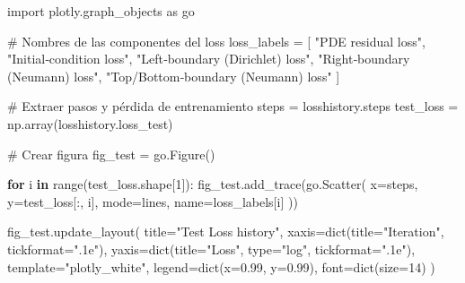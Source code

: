 \documentclass[
  spanish,
  us-letterpaper,
  DIV=11,
  numbers=noendperiod]{scrreprt}
\newenvironment{Shaded}{\begin{snugshade}}{\end{snugshade}}
\newcommand{\BuiltInTok}[1]{\textcolor[rgb]{0.00,0.23,0.31}{#1}}
\newcommand{\CommentTok}[1]{\textcolor[rgb]{0.37,0.37,0.37}{#1}}
\newcommand{\ControlFlowTok}[1]{\textcolor[rgb]{0.00,0.23,0.31}{\textbf{#1}}}
\newcommand{\DecValTok}[1]{\textcolor[rgb]{0.68,0.00,0.00}{#1}}
\newcommand{\FloatTok}[1]{\textcolor[rgb]{0.68,0.00,0.00}{#1}}
\newcommand{\ImportTok}[1]{\textcolor[rgb]{0.00,0.46,0.62}{#1}}
\newcommand{\KeywordTok}[1]{\textcolor[rgb]{0.00,0.23,0.31}{\textbf{#1}}}
\newcommand{\NormalTok}[1]{\textcolor[rgb]{0.00,0.23,0.31}{#1}}
\newcommand{\OperatorTok}[1]{\textcolor[rgb]{0.37,0.37,0.37}{#1}}
\newcommand{\StringTok}[1]{\textcolor[rgb]{0.13,0.47,0.30}{#1}}
\theoremstyle{plain}
\theoremstyle{definition}
\theoremstyle{remark}
\begin{document}
\begin{Shaded}
\begin{Highlighting}[]
\ImportTok{import}\NormalTok{ plotly.graph\_objects }\ImportTok{as}\NormalTok{ go}

\CommentTok{\# Nombres de las componentes del loss}
\NormalTok{loss\_labels }\OperatorTok{=}\NormalTok{ [}
    \StringTok{"PDE residual loss"}\NormalTok{,}
    \StringTok{"Initial‐condition loss"}\NormalTok{,}
    \StringTok{"Left‐boundary (Dirichlet) loss"}\NormalTok{,}
    \StringTok{"Right‐boundary (Neumann) loss"}\NormalTok{,}
    \StringTok{"Top/Bottom‐boundary (Neumann) loss"}
\NormalTok{]}

\CommentTok{\# Extraer pasos y pérdida de entrenamiento}
\NormalTok{steps }\OperatorTok{=}\NormalTok{ losshistory.steps}
\NormalTok{test\_loss }\OperatorTok{=}\NormalTok{ np.array(losshistory.loss\_test)}

\CommentTok{\# Crear figura}
\NormalTok{fig\_test }\OperatorTok{=}\NormalTok{ go.Figure()}

\ControlFlowTok{for}\NormalTok{ i }\KeywordTok{in} \BuiltInTok{range}\NormalTok{(test\_loss.shape[}\DecValTok{1}\NormalTok{]):}
\NormalTok{    fig\_test.add\_trace(go.Scatter(}
\NormalTok{        x}\OperatorTok{=}\NormalTok{steps,}
\NormalTok{        y}\OperatorTok{=}\NormalTok{test\_loss[:, i],}
\NormalTok{        mode}\OperatorTok{=}\StringTok{\textquotesingle{}lines\textquotesingle{}}\NormalTok{,}
\NormalTok{        name}\OperatorTok{=}\NormalTok{loss\_labels[i]}
\NormalTok{    ))}

\NormalTok{fig\_test.update\_layout(}
\NormalTok{    title}\OperatorTok{=}\StringTok{"Test Loss history"}\NormalTok{,}
\NormalTok{    xaxis}\OperatorTok{=}\BuiltInTok{dict}\NormalTok{(title}\OperatorTok{=}\StringTok{"Iteration"}\NormalTok{, tickformat}\OperatorTok{=}\StringTok{".1e"}\NormalTok{),}
\NormalTok{    yaxis}\OperatorTok{=}\BuiltInTok{dict}\NormalTok{(title}\OperatorTok{=}\StringTok{"Loss"}\NormalTok{, }\BuiltInTok{type}\OperatorTok{=}\StringTok{"log"}\NormalTok{, tickformat}\OperatorTok{=}\StringTok{".1e"}\NormalTok{),}
\NormalTok{    template}\OperatorTok{=}\StringTok{"plotly\_white"}\NormalTok{,}
\NormalTok{    legend}\OperatorTok{=}\BuiltInTok{dict}\NormalTok{(x}\OperatorTok{=}\FloatTok{0.99}\NormalTok{, y}\OperatorTok{=}\FloatTok{0.99}\NormalTok{),}
\NormalTok{    font}\OperatorTok{=}\BuiltInTok{dict}\NormalTok{(size}\OperatorTok{=}\DecValTok{14}\NormalTok{)}
\NormalTok{)}
\end{Highlighting}
\end{Shaded}
\end{document}
